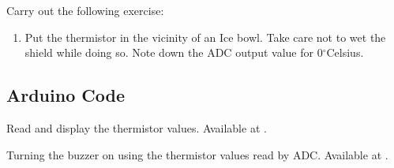 \begin{exercise}
  Carry out the following exercise:
  \begin{enumerate}
    \item Put the thermistor in the vicinity of an Ice bowl. Take care not
          to wet the shield while doing so. Note down the ADC output value for
          0$^{\circ}$Celsius.
  \end{enumerate}
\end{exercise}

\subsection{Arduino Code}
\label{sec:therm-arduino-code}

\begin{ardcode}
   {Read and display
    the thermistor values.  Available at
    .}
  \label{ard:therm-read}
  
\end{ardcode}

\begin{ardcode}
  {Turning the buzzer on using the thermistor values read by
    ADC.  Available at
    .}
  \label{ard:therm-buzzer}
  
\end{ardcode}

